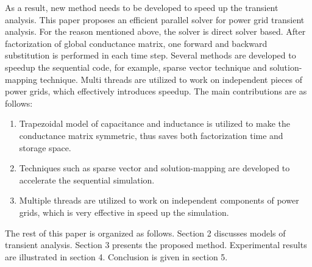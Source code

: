 As a result, new method needs to be developed to speed up the transient analysis. This paper proposes an efficient parallel solver for 
power grid transient analysis. For the reason mentioned above, the solver is direct solver based. After factorization of global conductance
matrix, one forward and backward substitution is performed in each time step. Several methods are developed to speedup the sequential code, for example, sparse vector technique and solution-mapping technique. Multi threads are utilized to work on independent pieces of power 
grids, which effectively introduces speedup. The main contributions are as follows:
  \begin{enumerate}[1)]
  \item Trapezoidal model of capacitance and inductance is utilized to make the conductance matrix symmetric, thus saves both factorization
	time and storage space.
  \item Techniques such as sparse vector and solution-mapping are developed to accelerate the sequential simulation.
  \item Multiple threads are utilized to work on independent components of power grids, which is very effective in speed up the 
	simulation.
  \end{enumerate} 

The rest of this paper is organized as follows. Section 2 discusses models of transient analysis. Section 3 presents the proposed method. 
Experimental results are illustrated in section 4. Conclusion is given in section 5.
